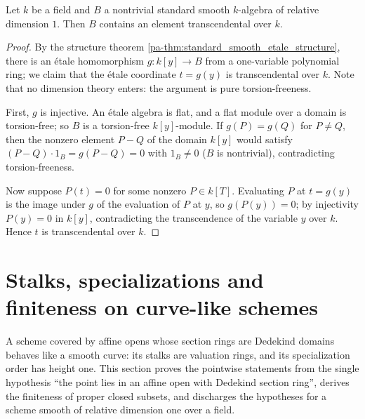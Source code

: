 \begin{theorem}
  \label{pa-thm:standard_smooth_transcendental}
  \leanok

  Let \(k\) be a field and \(B\) a nontrivial standard smooth \(k\)-algebra of relative
  dimension \(1\). Then \(B\) contains an element transcendental over \(k\).
\end{theorem}
\begin{proof}
  \leanok
  By the structure theorem \ref{pa-thm:standard_smooth_etale_structure}, there is an \'etale
  homomorphism \(g : k[y] \to B\) from a one-variable polynomial ring; we claim that the
  \'etale coordinate \(t = g(y)\) is transcendental over \(k\). Note that no dimension
  theory enters: the argument is pure torsion-freeness.

  First, \(g\) is injective. An \'etale algebra is flat, and a flat module over a domain is
  torsion-free; so \(B\) is a torsion-free \(k[y]\)-module. If \(g(P) = g(Q)\) for
  \(P \neq Q\), then the nonzero element \(P - Q\) of the domain \(k[y]\) would satisfy
  \((P - Q) \cdot 1_B = g(P - Q) = 0\) with \(1_B \neq 0\) (\(B\) is nontrivial),
  contradicting torsion-freeness.

  Now suppose \(P(t) = 0\) for some nonzero \(P \in k[T]\). Evaluating \(P\) at \(t = g(y)\)
  is the image under \(g\) of the evaluation of \(P\) at \(y\), so \(g(P(y)) = 0\); by
  injectivity \(P(y) = 0\) in \(k[y]\), contradicting the transcendence of the variable
  \(y\) over \(k\). Hence \(t\) is transcendental over \(k\).
\end{proof}

\section{Stalks, specializations and finiteness on curve-like schemes}

A scheme covered by affine opens whose section rings are Dedekind domains behaves like a
smooth curve: its stalks are valuation rings, and its specialization order has height one.
This section proves the pointwise statements from the single hypothesis ``the point lies in
an affine open with Dedekind section ring'', derives the finiteness of proper closed
subsets, and discharges the hypotheses for a scheme smooth of relative dimension one over a
field.

